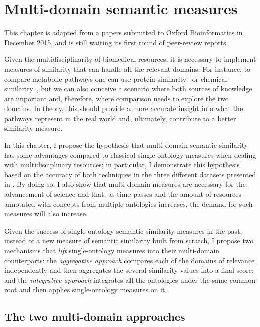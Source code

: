 \chapter{Multi-domain semantic measures} \label{chap:multidomain}

\begin{note-paper}
    This chapter is adapted from a papers submitted to Oxford Bioinformatics in December 2015, and is still waiting its first round of peer-review reports.
\end{note-paper}

Given the multidisciplinarity of biomedical resources, it is necessary to implement measures of similarity that can handle all the relevant domains. For instance, to compare metabolic pathways one can use protein similarity~\citep{Clemente2005} or chemical similarity~\citep{Grego2010}, but we can also conceive a scenario where both sources of knowledge are important and, therefore, where comparison needs to explore the two domains. In theory, this should provide a more accurate insight into what the pathways represent in the real world and, ultimately, contribute to a better similarity measure.

In this chapter, I propose the hypothesis that multi-domain semantic similarity has some advantages compared to classical single-ontology measures when dealing with multidisciplinary resources; in particular, I demonstrate this hypothesis based on the accuracy of both techniques in the three different datasets presented in . By doing so, I also show that multi-domain measures are necessary for the advancement of science and that, as time passes and the amount of resources annotated with concepts from multiple ontologies increases, the demand for such measures will also increase.

Given the success of single-ontology semantic similarity measures in the past, instead of a new measure of semantic similarity built from scratch, I propose two mechanisms that \emph{lift} single-ontology measures into their multi-domain counterparts: the \emph{aggregative approach} compares each of the domains of relevance independently and then aggregates the several similarity values into a final score; and the \emph{integrative approach} integrates all the ontologies under the same common root and then applies single-ontology measures on it.

\newpage

\section{The two multi-domain approaches} \label{sec:multidomain/approaches}

